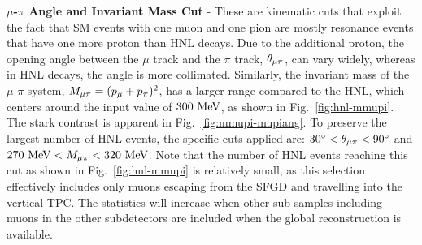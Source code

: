         \textbf{$\mu$-$\pi$ Angle and Invariant Mass Cut} - These are kinematic cuts that exploit the fact that SM events with one muon and one pion are mostly resonance events that have one more proton than HNL decays. Due to the additional proton, the opening angle between the $\mu$ track and the $\pi$ track, $\theta_{\mu\pi}$, can vary widely, whereas in HNL decays, the angle is more collimated. Similarly, the invariant mass of the $\mu$-$\pi$ system, $M_{\mu\pi}=(p_{\mu}+p_{\pi})^2$, has a larger range compared to the HNL, which centers around the input value of $300~\textrm{MeV}$, as shown in Fig.~\ref{fig:hnl-mmupi}.
        The stark contrast is apparent in Fig.~\ref{fig:mmupi-mupiang}. To preserve the largest number of HNL events, the specific cuts applied are: $30^\circ < \theta_{\mu\pi} < 90^\circ$ and $270~\textrm{MeV}<M_{\mu\pi}<320~\textrm{MeV}$. 
        Note that the number of HNL events reaching this cut as shown in Fig.~\ref{fig:hnl-mmupi} is relatively small, as this selection effectively includes only muons escaping from the SFGD and travelling into the vertical TPC. 
        The statistics will increase when other sub-samples including muons in the other subdetectors are included when the global reconstruction is available.
